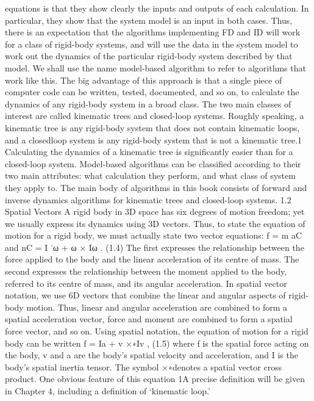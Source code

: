 equations is that they show clearly the inputs and outputs of each calculation. In particular, they show that the system model is an input in both cases. Thus, there is an expectation that the algorithms implementing FD and ID will work for a class of rigid-body systems, and will use the data in the system model to work out the dynamics of the particular rigid-body system described by that model. We shall use the name model-based algorithm to refer to algorithms that work like this. The big advantage of this approach is that a single piece of computer code can be written, tested, documented, and so on, to calculate the dynamics of any rigid-body system in a broad class. The two main classes of interest are called kinematic trees and closed-loop systems. Roughly speaking, a kinematic tree is any rigid-body system that does not contain kinematic loops, and a closedloop system is any rigid-body system that is not a kinematic tree.1 Calculating the dynamics of a kinematic tree is significantly easier than for a closed-loop system. Model-based algorithms can be classified according to their two main attributes: what calculation they perform, and what class of system they apply to. The main body of algorithms in this book consists of forward and inverse dynamics algorithms for kinematic trees and closed-loop systems. 1.2 Spatial Vectors A rigid body in 3D space has six degrees of motion freedom; yet we usually express its dynamics using 3D vectors. Thus, to state the equation of motion for a rigid body, we must actually state two vector equations: f = m aC and nC = I ˙ω + ω × Iω . (1.4) The first expresses the relationship between the force applied to the body and the linear acceleration of its centre of mass. The second expresses the relationship between the moment applied to the body, referred to its centre of mass, and its angular acceleration. In spatial vector notation, we use 6D vectors that combine the linear and angular aspects of rigid-body motion. Thus, linear and angular acceleration are combined to form a spatial acceleration vector, force and moment are combined to form a spatial force vector, and so on. Using spatial notation, the equation of motion for a rigid body can be written f = Ia + v ×∗Iv , (1.5) where f is the spatial force acting on the body, v and a are the body’s spatial velocity and acceleration, and I is the body’s spatial inertia tensor. The symbol ×∗denotes a spatial vector cross product. One obvious feature of this equation 1A precise definition will be given in Chapter 4, including a definition of ‘kinematic loop.’

